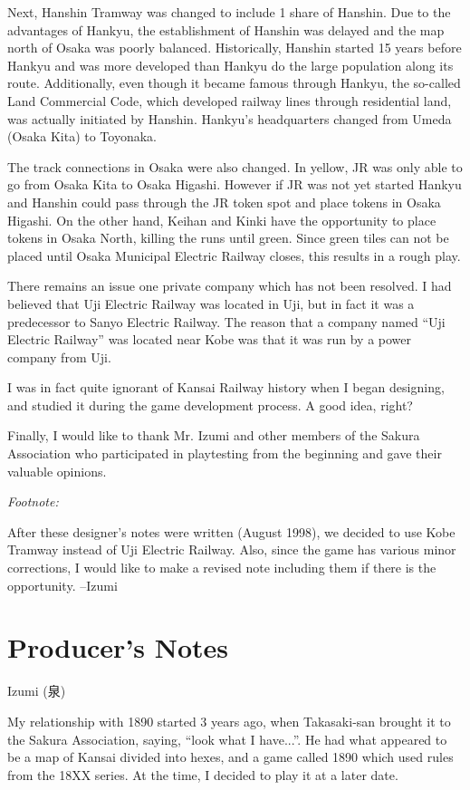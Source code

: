 \begin{multicols}{2}
Next, Hanshin Tramway was changed to include 1 share of Hanshin. Due
to the advantages of Hankyu, the establishment of Hanshin was delayed
and the map north of Osaka was poorly balanced. Historically, Hanshin
started 15 years before Hankyu and was more developed than Hankyu do
the large population along its route. Additionally, even though it
became famous through Hankyu, the so-called Land Commercial Code,
which developed railway lines through residential land, was actually
initiated by Hanshin. Hankyu's headquarters changed from Umeda (Osaka
Kita) to Toyonaka.

The track connections in Osaka were also changed. In yellow, JR was
only able to go from Osaka Kita to Osaka Higashi. However if JR was
not yet started Hankyu and Hanshin could pass through the JR token
spot and place tokens in Osaka Higashi. On the other hand, Keihan and
Kinki have the opportunity to place tokens in Osaka North, killing the
runs until green. Since green tiles can not be placed until Osaka
Municipal Electric Railway closes, this results in a rough play.

There remains an issue one private company which has not been
resolved. I had believed that Uji Electric Railway was located in Uji,
but in fact it was a predecessor to Sanyo Electric Railway. The reason
that a company named ``Uji Electric Railway'' was located near Kobe
was that it was run by a power company from Uji.

I was in fact quite ignorant of Kansai Railway history when I began
designing, and studied it during the game development process. A good
idea, right?

Finally, I would like to thank Mr. Izumi and other members of the
Sakura Association who participated in playtesting from the beginning and
gave their valuable opinions.

{\itshape Footnote:

After these designer's notes were written (August 1998), we decided to use Kobe
Tramway instead of Uji Electric Railway. Also, since the game has
various minor corrections, I would like to make a revised note
including them if there is the opportunity. --Izumi}

\section{Producer's Notes}
{\large Izumi (泉)}

My relationship with 1890 started 3 years ago, when Takasaki-san
brought it to the Sakura Association, saying, ``look what I
have...''. He had what appeared to be a map of Kansai divided into
hexes, and a game called 1890 which used rules from the 18XX
series. At the time, I decided to play it at a later date.


\end{multicols}
